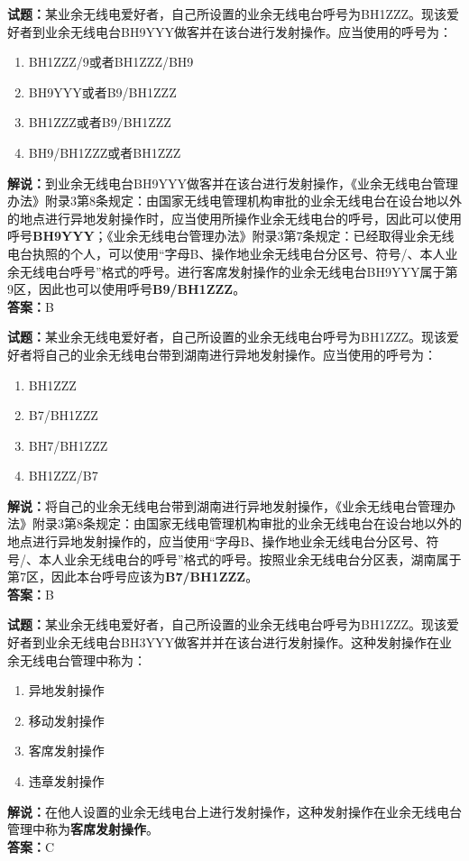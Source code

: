 \documentclass{ctexbook}
\begin{document}
\vspace{1em}

\textbf{试题：}某业余无线电爱好者，自己所设置的业余无线电台呼号为BH1ZZZ。现该爱好者到业余无线电台BH9YYY做客并在该台进行发射操作。应当使用的呼号为：
\begin{enumerate}[leftmargin=3em]
  \item BH1ZZZ/9或者BH1ZZZ/BH9
  \item BH9YYY或者B9/BH1ZZZ
  \item BH1ZZZ或者B9/BH1ZZZ
  \item BH9/BH1ZZZ或者BH1ZZZ
\end{enumerate}
\noindent\textbf{解说：}到业余无线电台BH9YYY做客并在该台进行发射操作，《业余无线电台管理办法》附录3第8条规定：由国家无线电管理机构审批的业余无线电台在设台地以外的地点进行异地发射操作时，应当使用所操作业余无线电台的呼号，因此可以使用呼号\textbf{BH9YYY}；《业余无线电台管理办法》附录3第7条规定：已经取得业余无线电台执照的个人，可以使用“字母B、操作地业余无线电台分区号、符号/、本人业余无线电台呼号”格式的呼号。进行客席发射操作的业余无线电台BH9YYY属于第9区，因此也可以使用呼号\textbf{B9/BH1ZZZ}。\\\noindent\textbf{答案：}B

\vspace{1em}

\textbf{试题：}某业余无线电爱好者，自己所设置的业余无线电台呼号为BH1ZZZ。现该爱好者将自己的业余无线电台带到湖南进行异地发射操作。应当使用的呼号为：
\begin{enumerate}[leftmargin=3em]
  \item BH1ZZZ
  \item B7/BH1ZZZ
  \item BH7/BH1ZZZ
  \item BH1ZZZ/B7
\end{enumerate}
\noindent\textbf{解说：}将自己的业余无线电台带到湖南进行异地发射操作，《业余无线电台管理办法》附录3第8条规定：由国家无线电管理机构审批的业余无线电台在设台地以外的地点进行异地发射操作的，应当使用“字母B、操作地业余无线电台分区号、符号/、本人业余无线电台的呼号”格式的呼号。按照业余无线电台分区表，湖南属于第7区，因此本台呼号应该为\textbf{B7/BH1ZZZ}。\\\noindent\textbf{答案：}B

\vspace{1em}

\textbf{试题：}某业余无线电爱好者，自己所设置的业余无线电台呼号为BH1ZZZ。现该爱好者到业余无线电台BH3YYY做客并并在该台进行发射操作。这种发射操作在业余无线电台管理中称为：
\begin{enumerate}[leftmargin=3em]
  \item 异地发射操作
  \item 移动发射操作
  \item 客席发射操作
  \item 违章发射操作
\end{enumerate}
\noindent\textbf{解说：}在他人设置的业余无线电台上进行发射操作，这种发射操作在业余无线电台管理中称为\textbf{客席发射操作}。\\\noindent\textbf{答案：}C
\end{document}

